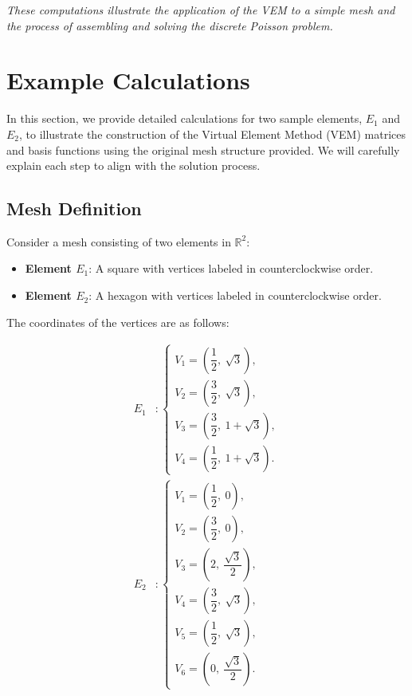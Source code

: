 \documentclass[class=article, crop=false]{standalone}
\begin{document}
\noindent
\textit{These computations illustrate the application of the VEM to a simple mesh and the process of assembling and solving the discrete Poisson problem.}

\newpage

\section{Example Calculations}

In this section, we provide detailed calculations for two sample elements, \( E_1 \) and \( E_2 \), to illustrate the construction of the Virtual Element Method (VEM) matrices and basis functions using the original mesh structure provided. We will carefully explain each step to align with the solution process.

\subsection{Mesh Definition}

Consider a mesh consisting of two elements in \( \mathbb{R}^2 \):

\begin{itemize}
    \item \textbf{Element \( E_1 \)}: A square with vertices labeled in counterclockwise order.
    \item \textbf{Element \( E_2 \)}: A hexagon with vertices labeled in counterclockwise order.
\end{itemize}

The coordinates of the vertices are as follows:

\begin{align*}
E_1 &: \begin{cases}
    V_1 = \left( \dfrac{1}{2},\ \sqrt{3} \right), \\
    V_2 = \left( \dfrac{3}{2},\ \sqrt{3} \right), \\
    V_3 = \left( \dfrac{3}{2},\ 1 + \sqrt{3} \right), \\ 
    V_4 = \left( \dfrac{1}{2},\ 1 + \sqrt{3} \right).
\end{cases} \\
E_2 &: \begin{cases}
    V_1 = \left( \dfrac{1}{2},\ 0 \right), \\ 
    V_2 = \left( \dfrac{3}{2},\ 0 \right), \\ 
    V_3 = \left( 2,\ \dfrac{\sqrt{3}}{2} \right), \\
    V_4 = \left( \dfrac{3}{2},\ \sqrt{3} \right), \\
    V_5 = \left( \dfrac{1}{2},\ \sqrt{3} \right), \\ 
    V_6 = \left( 0,\ \dfrac{\sqrt{3}}{2} \right).
\end{cases}
\end{align*}
\end{document}
